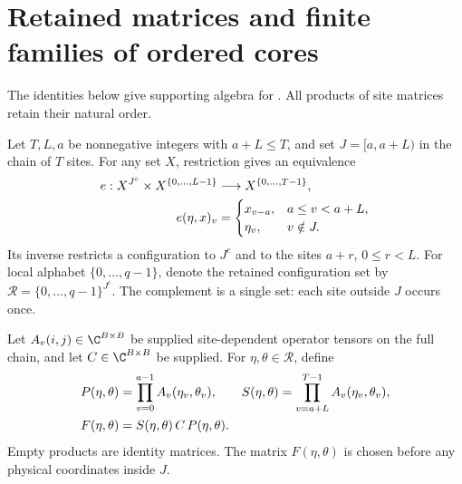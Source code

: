 \section{Retained matrices and finite families of ordered cores}

The identities below give supporting algebra for
\cite[Proposition~5.7]{Arad2016RigorousRG}.
All products of site matrices retain their natural order.

\begin{definition}
    \label{def:retained_interval_coordinates}
    \leanok
    Let $T,L,a$ be nonnegative integers with $a+L\le T$, and set
    $J=[a,a+L)$ in the chain of $T$ sites. For any set $X$, restriction gives
    an equivalence
    \begin{align}
        e:X^{J^c}\times X^{\{0,\ldots,L-1\}} & \longrightarrow
        X^{\{0,\ldots,T-1\}},\notag                            \\
        e(\eta,x)_v                          & =
        \begin{cases}x_{v-a},&a\le v<a+L,\\ \eta_v,&v\notin J.\end{cases}
        \label{eq:retained_interval_coordinates}
    \end{align}
    Its inverse restricts a configuration to $J^c$ and to the sites $a+r$,
    $0\le r<L$. For local alphabet $\{0,\ldots,q-1\}$, denote the retained
    configuration set by $\mathcal R=\{0,\ldots,q-1\}^{J^c}$.
    The complement is a single set: each site outside $J$ occurs once.
\end{definition}

\begin{definition}
    \label{def:actual_retained_interval_closing}
    \leanok
    Let $A_v(i,j)\in\C^{B\times B}$ be supplied site-dependent operator
    tensors on the full chain, and let $C\in\C^{B\times B}$ be supplied.
    For $\eta,\theta\in\mathcal R$, define
    \begin{align}
        P(\eta,\theta) & =\prod_{v=0}^{a-1}A_v(\eta_v,\theta_v),         &
        S(\eta,\theta) & =\prod_{v=a+L}^{T-1}A_v(\eta_v,\theta_v),\notag   \\
        F(\eta,\theta) & =S(\eta,\theta)\,C\,P(\eta,\theta).
        \label{eq:actual_retained_interval_closing}
    \end{align}
    Empty products are identity matrices. The matrix $F(\eta,\theta)$ is
    chosen before any physical coordinates inside $J$.
\end{definition}


